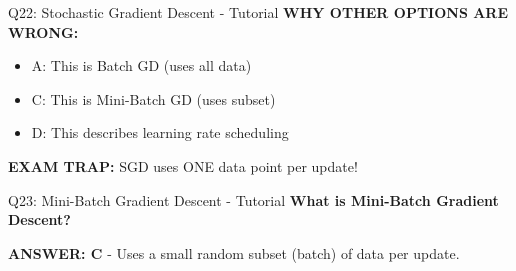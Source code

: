 \documentclass[8pt]{beamer}
\begin{document}
\begin{frame}{Q22: Stochastic Gradient Descent - Tutorial}
		\vspace{0.05cm}
		\textcolor{myred}{\textbf{WHY OTHER OPTIONS ARE WRONG:}}
		\begin{itemize}
			\item \textcolor{myred}{A:} This is Batch GD (uses all data)
			\item \textcolor{myred}{C:} This is Mini-Batch GD (uses subset)
			\item \textcolor{myred}{D:} This describes learning rate scheduling
		\end{itemize}
		
		\textcolor{myred}{\textbf{EXAM TRAP:}} SGD uses \textcolor{myblue}{ONE data point} per update!
	\end{frame}
	
	\begin{frame}{Q23: Mini-Batch Gradient Descent - Tutorial}
		\fontsize{6.5}{7.5}\selectfont
		\textbf{What is Mini-Batch Gradient Descent?}
		
		\vspace{0.05cm}
		\textcolor{myblue}{\textbf{ANSWER: C}} - Uses a small random subset (batch) of data per update.
		

\end{frame}
\end{document}
